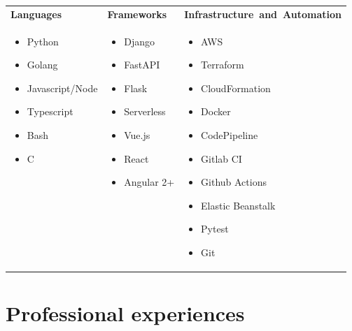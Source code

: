 \documentclass[letterpaper]{twentysecondcv} %
\begin{document}
\begin{tabular}{ p{4cm} p{4cm} p{5cm}}
    \textbf{Languages} & \textbf{Frameworks} & \textbf{Infrastructure~and~Automation} \\
    
    \begin{itemize}
      \item Python
      \item Golang
      \item Javascript/Node
      \item Typescript 
      \item Bash 
      \item C
    \end{itemize}  &
    \begin{itemize}
      \item Django
      \item FastAPI
      \item Flask
      \item Serverless
      \item Vue.js 
      \item React 
      \item Angular 2+ 
    \end{itemize} &
    \begin{itemize}
      \item AWS
      \item Terraform
      \item CloudFormation
      \item Docker
      \item CodePipeline
      \item Gitlab CI
      \item Github Actions
      \item Elastic Beanstalk
      \item Pytest
      \item Git 
    \end{itemize} \\
\end{tabular}

\vspace{-0.5cm}


\section{Professional experiences}
\end{document}
